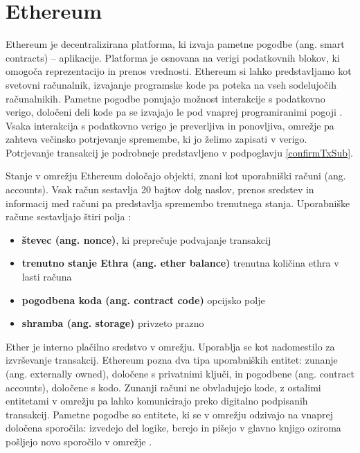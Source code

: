 \documentclass[a4paper, 12pt]{book}
\begin{document}
\section{Ethereum}
Ethereum je decentralizirana platforma, ki izvaja pametne pogodbe (ang. smart contracts) -- aplikacije.
Platforma je osnovana na verigi podatkovnih blokov, ki omogoča reprezentacijo in prenos vrednosti.
Ethereum si lahko predstavljamo kot svetovni računalnik, izvajanje programske kode pa poteka na vseh sodelujočih računalnikih.
Pametne pogodbe ponujajo možnost interakcije s podatkovno verigo, določeni deli kode pa se izvajajo le pod vnaprej programiranimi pogoji \cite{ethereumWhitepaper}.
Vsaka interakcija s podatkovno verigo je preverljiva in ponovljiva, omrežje pa zahteva večinsko potrjevanje spremembe, ki jo želimo zapisati v verigo. Potrjevanje transakcij je podrobneje predstavljeno v podpoglavju \ref{confirmTxSub}.

Stanje v omrežju Ethereum določajo objekti, znani kot uporabniški računi (ang. accounts).
Vsak račun sestavlja 20 bajtov dolg naslov, prenos sredstev in informacij med računi pa predstavlja spremembo trenutnega stanja.
Uporabniške račune sestavljajo štiri polja \cite{ethereumWhitepaper}:
\begin{itemize}
\item \textbf{števec (ang. nonce)}, ki preprečuje podvajanje transakcij
\item \textbf{trenutno stanje Ethra (ang. ether balance)} trenutna količina ethra v lasti računa
\item \textbf{pogodbena koda (ang. contract code)} opcijsko polje
\item \textbf{shramba (ang. storage)} privzeto prazno
\end{itemize}

Ether je interno plačilno sredstvo v omrežju.
Uporablja se kot nadomestilo za izvrševanje transakcij.
Ethereum pozna dva tipa uporabniških entitet: zunanje (ang. externally owned), določene s privatnimi ključi, in pogodbene (ang. contract accounts), določene s kodo.
Zunanji računi ne obvladujejo kode, z ostalimi entitetami v omrežju pa lahko komunicirajo preko digitalno podpisanih transakcij.
Pametne pogodbe so entitete, ki se v omrežju odzivajo na vnaprej določena sporočila: izvedejo del logike, berejo in pišejo v glavno knjigo oziroma pošljejo novo sporočilo v omrežje \cite{ethereumWhitepaper}.
\end{document}
